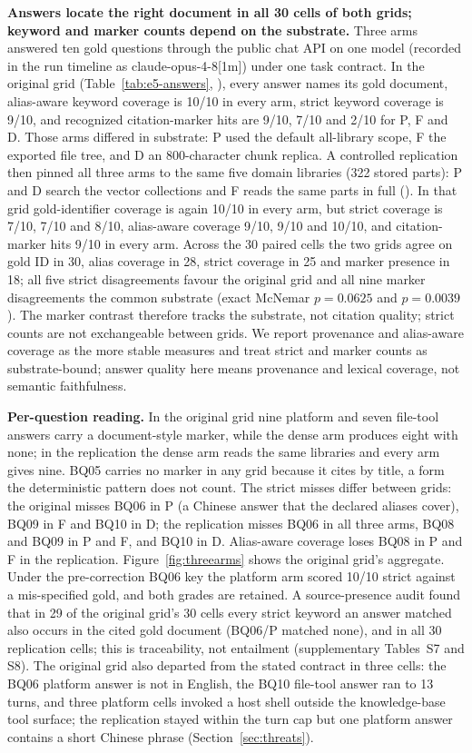 \textbf{Answers locate the right document in all 30 cells of both grids;
keyword and marker counts depend on the substrate.}
Three arms answered ten gold questions through the public chat API on one model
(recorded in the run timeline as claude-opus-4-8[1m]) under one task contract.
In the original grid (Table~\ref{tab:e5-answers},
), every answer names its gold document,
alias-aware keyword coverage is 10/10 in every arm, strict keyword coverage is
9/10, and recognized citation-marker hits are 9/10, 7/10 and 2/10 for P, F and
D. Those arms differed in substrate: P used the default all-library scope, F
the exported file tree, and D an 800-character chunk replica. A controlled
replication then pinned all three arms to the same five domain libraries (322
stored parts): P and D search the vector collections and F reads the same
parts in full (). In that grid gold-identifier
coverage is again 10/10 in every arm, but strict coverage is 7/10, 7/10 and
8/10, alias-aware coverage 9/10, 9/10 and 10/10, and citation-marker hits
9/10 in every arm. Across the 30 paired cells the two grids agree on gold ID
in 30, alias coverage in 28, strict coverage in 25 and marker presence in 18;
all five strict disagreements favour the original grid and all nine marker
disagreements the common substrate (exact McNemar $p=0.0625$ and
$p=0.0039$). The marker contrast therefore tracks the substrate, not citation
quality; strict counts are not exchangeable between grids. We report
provenance and alias-aware coverage as the more stable measures and treat
strict and marker counts as substrate-bound; answer quality here means
provenance and lexical coverage, not semantic faithfulness.

\textbf{Per-question reading.}
In the original grid nine platform and seven file-tool answers carry a
document-style marker, while the dense arm produces eight with none; in the
replication the dense arm reads the same libraries and every arm gives nine. BQ05 carries no marker in any grid because it cites by title, a
form the deterministic pattern does not count. The strict misses differ between grids: the
original misses BQ06 in P (a Chinese answer that the declared aliases cover),
BQ09 in F and BQ10 in D; the replication misses BQ06 in all three arms, BQ08
and BQ09 in P and F, and BQ10 in D. Alias-aware coverage loses BQ08 in P and F
in the replication. Figure~\ref{fig:threearms}
shows the original grid's aggregate. Under the
pre-correction BQ06 key the platform arm scored 10/10 strict against a
mis-specified gold, and both grades are retained. A source-presence audit
found that in 29 of the original grid's 30 cells every strict keyword an
answer matched also occurs in the cited gold document (BQ06/P matched none),
and in all 30 replication cells; this is traceability, not entailment
(supplementary Tables~S7 and S8). The original grid also departed from the
stated contract in three cells: the BQ06 platform answer is not in English,
the BQ10 file-tool answer ran to 13 turns, and three platform cells invoked a
host shell outside the knowledge-base tool surface; the replication stayed
within the turn cap but one platform answer contains a short Chinese phrase
(Section~\ref{sec:threats}).

